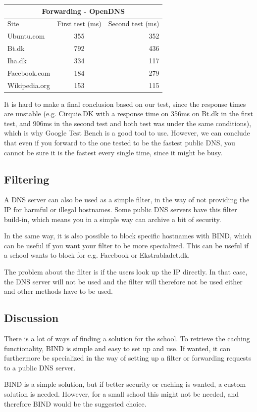 \documentclass[Preamble]{subfiles}
\begin{document}
\begin{center}
  \begin{tabular}{ l | c  | r}
    \multicolumn{3}{c}{Forwarding - OpenDNS}  \\
	\hline Site & First test (ms) & Second test (ms) \\     
    \hline
    Ubuntu.com & 355 & 352  \\ \hline
    Bt.dk & 792 & 436  \\ \hline
	Iha.dk & 334 & 117 \\ \hline
	Facebook.com & 184 & 279 \\ \hline
	Wikipedia.org & 153 & 115 \\ \hline
  \end{tabular}
\end{center}

It is hard to make a final conclusion based on our test, since the response times are unstable (e.g. Cirquie.DK with a response time on 356ms on Bt.dk in the first test, and 906ms in the second test and both test was under the same conditions), which is why Google Test Bench is a good tool to use. However, we can conclude that even if you forward to the one tested to be the fastest public DNS, you cannot be sure it is the fastest every single time, since it might be busy.

\subsection{Filtering}
A DNS server can also be used as a simple filter, in the way of not providing the IP for harmful or illegal hostnames. Some public DNS servers have this filter build-in, which means you in a simple way can archive a bit of security.

In the same way, it is also possible to block specific hostnames with BIND, which can be useful if you want your filter to be more specialized. This can be useful if a school wants to block for e.g. Facebook or Ekstrabladet.dk.

The problem about the filter is if the users look up the IP directly. In that case, the DNS server will not be used and the filter will therefore not be used either and other methods have to be used.

\subsection{Discussion}
There is a lot of ways of finding a solution for the school. To retrieve the caching functionality, BIND is simple and easy to set up and use. If wanted, it can furthermore be specialized in the way of setting up a filter or forwarding requests to a public DNS server.  

BIND is a simple solution, but if better security or caching is wanted, a custom solution is needed. However, for a small school this might not be needed, and therefore BIND would be the suggested choice.
\end{document}

